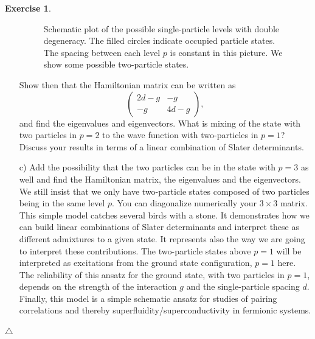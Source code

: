 \documentclass{report}
\theoremstyle{plain}
\theoremstyle{definition}
\newtheorem{exerc}{Exercise}[chapter]
\newcommand\xqed[1]{%
  \leavevmode\unskip\penalty9999 \hbox{}\nobreak\hfill
  \quad\hbox{#1}}
\newcommand\demo{\xqed{$\triangle$}}
\newenvironment{exercise}{\bigskip\begin{exerc}}{\demo\end{exerc}\bigskip}
\begin{document}
\begin{exercise}
\begin{enumerate}
\begin{figure}
\begin{center}
\end{center}
\caption{Schematic plot of the possible single-particle levels with double degeneracy.
The filled circles indicate occupied particle states.
The spacing between each level $p$ is constant in this picture. We show some possible two-particle states.\label{fig:exercise-orbitals}}
\end{figure}
Show then that the Hamiltonian matrix can be written as 
\[
\left(\begin{array}{cc}2d-g &-g \\
-g &4d-g \end{array}\right),
\]
and find the eigenvalues and eigenvectors.  What is mixing of the state with two particles in $p=2$ 
to the wave function with two-particles in $p=1$? Discuss your results in terms of a linear combination
of Slater determinants.  \\
\item[c)] Add the possibility that the two particles can be in the state with $p=3$ as well and find the Hamiltonian
matrix, the eigenvalues and the eigenvectors. We still insist that we only have two-particle states composed of two particles being in the same
level $p$. You can diagonalize numerically your $3\times 3$ matrix.\newline\newline
This simple model catches several birds with a stone. It demonstrates how we can build linear combinations
of Slater determinants and interpret these as different admixtures to a given state. It represents also the way we are going to interpret these contributions.  The two-particle states above $p=1$ will be interpreted as 
excitations from the ground state configuration, $p=1$ here.  The reliability of this ansatz for the ground state, 
with two particles in $p=1$,
depends on the strength of the interaction $g$ and the single-particle spacing $d$.
Finally, this model is a simple schematic ansatz for studies of pairing correlations and thereby superfluidity/superconductivity  
in fermionic systems. 
\end{enumerate}


\end{exercise}
\end{document}
